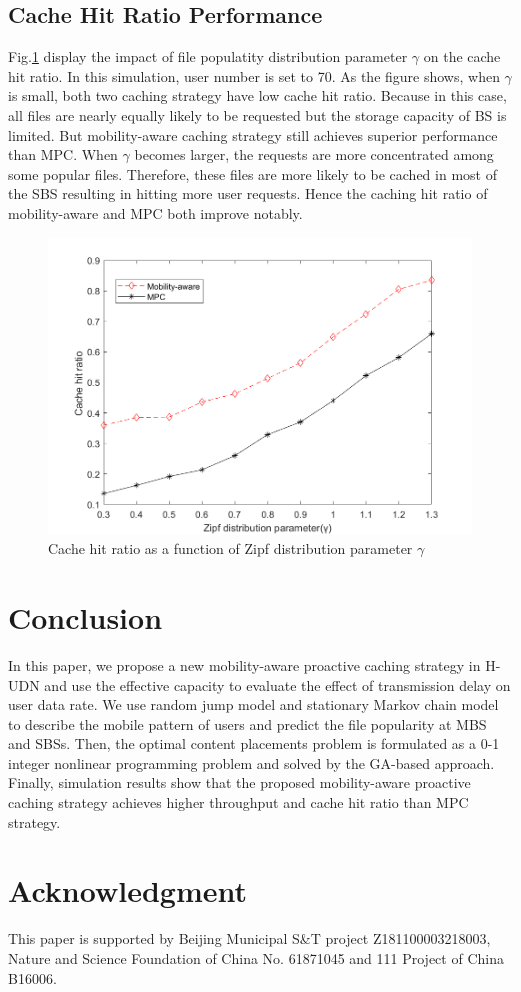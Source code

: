\documentclass[conference]{IEEEtran}
\begin{document}
\subsection{Cache Hit Ratio Performance}
Fig.\ref{fig 5} display the impact of file populatity distribution parameter $\gamma$ on the cache hit ratio. In this simulation, user number is set to 70. As the figure shows, when $\gamma$is small, both two caching strategy have low cache hit ratio. Because in this case, all files are nearly equally likely to be requested but the storage capacity of BS is limited. But mobility-aware caching strategy still achieves superior performance than MPC. When $\gamma$ becomes larger, the requests are more concentrated among some popular files. Therefore, these files are more likely to be cached in most of the SBS resulting in hitting more user requests. Hence the caching hit ratio of mobility-aware and MPC both improve notably.
\begin{figure}[htbp]
 \centerline{\includegraphics[scale=0.3]{fig5.png}}
 \caption{Cache hit ratio as a function of Zipf distribution parameter $\gamma$ }
 \label{fig 5}
\end{figure}
\section{Conclusion}

In this paper, we propose a new mobility-aware proactive caching strategy in H-UDN and use the effective capacity to evaluate the effect of transmission delay on user data rate. We use random jump model and stationary Markov chain model to describe the mobile pattern of users and predict the file popularity at MBS and SBSs. Then, the optimal content placements problem is formulated as a 0-1 integer nonlinear programming problem and solved by the GA-based approach. Finally, simulation results show that the proposed mobility-aware proactive caching strategy achieves higher throughput and cache hit ratio than MPC strategy.

\section*{Acknowledgment}

This paper is supported by Beijing Municipal S\&T project Z181100003218003, Nature and Science Foundation of China No. 61871045 and 111 Project of China B16006.



\end{document}
